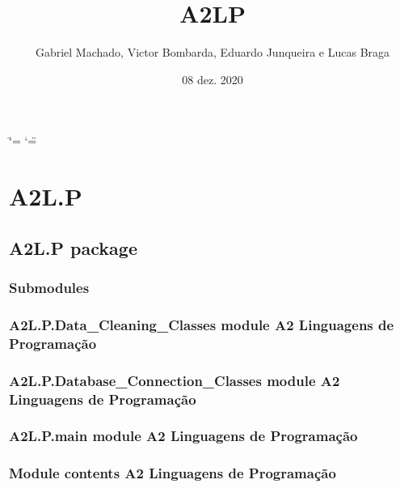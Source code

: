 \documentclass[letterpaper,10pt,brazil]{sphinxmanual}
\title{A2\sphinxhyphen{}LP}
\date{08 dez. 2020}
\author{Gabriel Machado, Victor Bombarda, Eduardo Junqueira e Lucas Braga}
\begin{document}
\ifdefined\shorthandoff
  \ifnum\catcode`\=\string=\active\shorthandoff{=}\fi
  \ifnum\catcode`\"=\active{}\fi
\fi

\pagestyle{empty}
\sphinxmaketitle
\pagestyle{plain}
\sphinxtableofcontents
\pagestyle{normal}
\label{\detokenize{index::doc}}



\chapter{A2\sphinxhyphen{}L.P}
\label{\detokenize{modules:a2-l-p}}\label{\detokenize{modules::doc}}

\section{A2\sphinxhyphen{}L.P package}
\label{\detokenize{A2-L.P:a2-l-p-package}}\label{\detokenize{A2-L.P::doc}}

\subsection{Submodules}
\label{\detokenize{A2-L.P:submodules}}

\subsection{A2\sphinxhyphen{}L.P.Data\_Cleaning\_Classes module \sphinxhyphen{} A2 \sphinxhyphen{} Linguagens de Programação}
\label{\detokenize{A2-L.P:a2-l-p-data-cleaning-classes-module-a2-linguagens-de-programacao}}

\subsection{A2\sphinxhyphen{}L.P.Database\_Connection\_Classes module \sphinxhyphen{} A2 \sphinxhyphen{} Linguagens de Programação}
\label{\detokenize{A2-L.P:a2-l-p-database-connection-classes-module-a2-linguagens-de-programacao}}

\subsection{A2\sphinxhyphen{}L.P.main module \sphinxhyphen{} A2 \sphinxhyphen{} Linguagens de Programação}
\label{\detokenize{A2-L.P:a2-l-p-main-module-a2-linguagens-de-programacao}}

\subsection{Module contents \sphinxhyphen{} A2 \sphinxhyphen{} Linguagens de Programação}
\label{\detokenize{A2-L.P:module-contents-a2-linguagens-de-programacao}}
\end{document}
